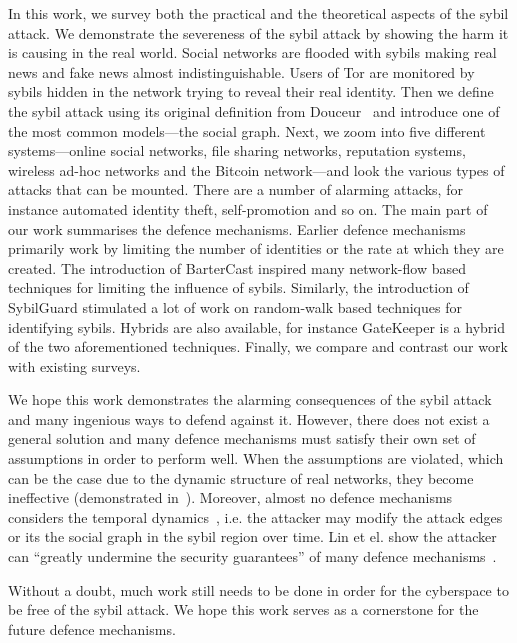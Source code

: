In this work, we survey both the practical and the theoretical aspects of the
sybil attack. We demonstrate the severeness of the sybil attack by showing the
harm it is causing in the real world. Social networks are flooded with sybils
making real news and fake news almost indistinguishable. Users of Tor are
monitored by sybils hidden in the network trying to reveal their real identity.
Then we define the sybil attack using its original definition from
Douceur~\cite{douceur2002sybil} and introduce one of the most common
models---the social graph. Next, we zoom into five different systems---online
social networks, file sharing networks, reputation systems, wireless ad-hoc
networks and the Bitcoin network---and look the various types of attacks that
can be mounted. There are a number of alarming attacks, for instance automated
identity theft, self-promotion and so on. The main part of our work summarises
the defence mechanisms. Earlier defence mechanisms primarily work by limiting
the number of identities or the rate at which they are created. The introduction
of BarterCast inspired many network-flow based techniques for limiting the
influence of sybils. Similarly, the introduction of SybilGuard stimulated a lot
of work on random-walk based techniques for identifying sybils. Hybrids are also
available, for instance GateKeeper is a hybrid of the two aforementioned
techniques. Finally, we compare and contrast our work with existing surveys.

We hope this work demonstrates the alarming consequences of the sybil attack and
many ingenious ways to defend against it. However, there does not exist a
general solution and many defence mechanisms must satisfy their own set of
assumptions in order to perform well. When the assumptions are violated, which
can be the case due to the dynamic structure of real networks, they become
ineffective (demonstrated in~\cite{liu2016smartwalk}). Moreover, almost no
defence mechanisms considers the temporal dynamics~\cite{liu2015exploiting},
i.e. the attacker may modify the attack edges or its the social graph in the
sybil region over time. Lin et el. show the attacker can ``greatly undermine the
security guarantees'' of many defence mechanisms~\cite{liu2015exploiting}.

Without a doubt, much work still needs to be done in order for the cyberspace to
be free of the sybil attack. We hope this work serves as a cornerstone for the
future defence mechanisms.

